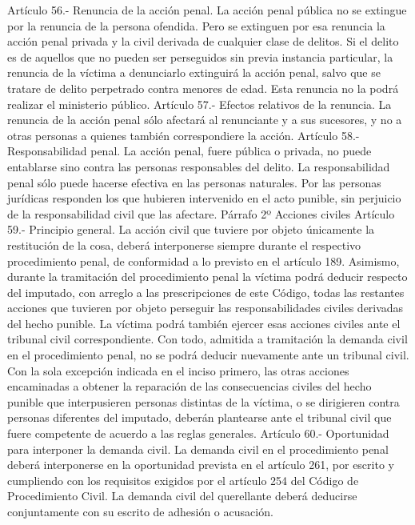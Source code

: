     Artículo 56.- Renuncia de la acción penal. La acción penal pública no se extingue por la renuncia de la persona ofendida.
    Pero se extinguen por esa renuncia la acción penal privada y la civil derivada de cualquier clase de delitos.
    Si el delito es de aquellos que no pueden ser perseguidos sin previa instancia particular, la renuncia de la víctima a denunciarlo extinguirá la acción penal, salvo que se tratare de delito perpetrado contra menores de edad.
    Esta renuncia no la podrá realizar el ministerio público.
    Artículo 57.- Efectos relativos de la renuncia. La renuncia de la acción penal sólo afectará al renunciante y a sus sucesores, y no a otras personas a quienes también correspondiere la acción.
    Artículo 58.- Responsabilidad penal. La acción penal, fuere pública o privada, no puede entablarse sino contra las personas responsables del delito.
    La responsabilidad penal sólo puede hacerse efectiva en las personas naturales. Por las personas jurídicas responden los que hubieren intervenido en el acto punible, sin perjuicio de la responsabilidad civil que las afectare.
    Párrafo 2º Acciones civiles
    Artículo 59.- Principio general. La acción civil que tuviere por objeto únicamente la restitución de la cosa, deberá interponerse siempre durante el respectivo procedimiento penal, de conformidad a lo previsto en el artículo 189.
    Asimismo, durante la tramitación del procedimiento penal la víctima podrá deducir respecto del imputado, con arreglo a las prescripciones de este Código, todas las restantes acciones que tuvieren por objeto perseguir las responsabilidades civiles derivadas del hecho punible. La víctima podrá también ejercer esas acciones civiles ante el tribunal civil correspondiente. Con todo, admitida a tramitación la demanda civil en el procedimiento penal, no se podrá deducir nuevamente ante un tribunal civil.
    Con la sola excepción indicada en el inciso primero, las otras acciones encaminadas a obtener la reparación de las consecuencias civiles del hecho punible que interpusieren personas distintas de la víctima, o se dirigieren contra personas diferentes del imputado, deberán plantearse ante el tribunal civil que fuere competente de acuerdo a las reglas generales.
    Artículo 60.- Oportunidad para interponer la demanda civil. La demanda civil en el procedimiento penal deberá interponerse en la oportunidad prevista en el artículo 261, por escrito y cumpliendo con los requisitos exigidos por el artículo 254 del Código de Procedimiento Civil. La demanda civil del querellante deberá deducirse conjuntamente con su escrito de adhesión o acusación.

